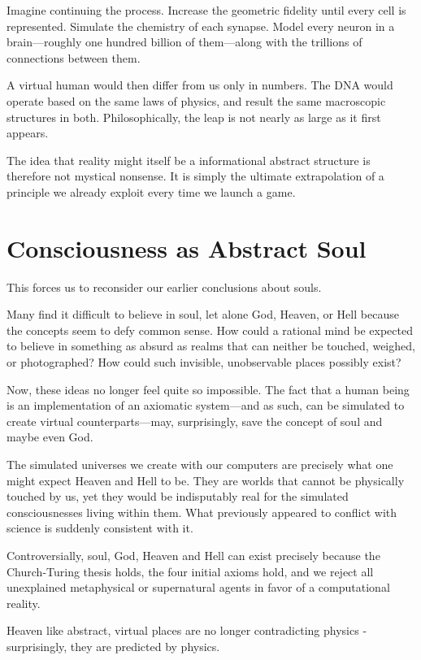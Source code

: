 Imagine continuing the process. Increase the geometric fidelity until every cell is represented. Simulate the chemistry of each synapse.
Model every neuron in a brain—roughly one hundred billion of them—along with the trillions of connections between them. 

A virtual human would then differ from us only in numbers. The DNA would operate based on the same laws of physics, and
result the same macroscopic structures in both. Philosophically, the leap is not nearly as large as it first appears.

The idea that reality might itself be a informational abstract structure is therefore not mystical nonsense.
It is simply the ultimate extrapolation of a principle we already exploit every time we launch a game.



\section{Consciousness as Abstract Soul}

This forces us to reconsider our earlier conclusions about souls.

Many find it difficult to believe in soul, let alone God, Heaven, or Hell because the concepts seem to defy common sense.
How could a rational mind be expected to believe in something as absurd as realms that can neither be touched, weighed, or photographed?
How could such invisible, unobservable places possibly exist?

Now, these ideas no longer feel quite so impossible.
The fact that a human being is an implementation of an axiomatic system—and as such, can be simulated to create virtual counterparts—may, surprisingly, save the concept of
soul and maybe even God.

The simulated universes we create with our computers are precisely what one might expect Heaven and Hell to be.
They are worlds that cannot be physically touched by us, yet they would be indisputably real for the simulated consciousnesses living within them.
What previously appeared to conflict with science is suddenly consistent with it.

Controversially, soul, God, Heaven and Hell can exist precisely because the Church-Turing thesis holds,
the four initial axioms hold, and we reject all unexplained metaphysical or supernatural agents in favor of a computational reality.

Heaven like abstract, virtual places are no longer contradicting physics - surprisingly, they are predicted by physics.



